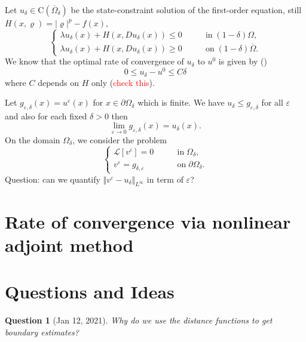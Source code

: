 \documentclass[11pt,reqno]{amsart}
\numberwithin{figure}{section}
\theoremstyle{plain}
\newtheorem{quest}{Question}
\theoremstyle{remark}
\numberwithin{equation}{section}
\newcommand{\rmC}{\mathrm{C}}
\begin{document}
\noindent Let $u_\delta\in \rmC(\overline{\Omega}_\delta)$ be the state-constraint solution of the first-order equation, still $H(x,\varrho) = |\varrho|^p - f(x)$,
\begin{equation*}
    \begin{cases}
    \lambda u_\delta(x) + H(x,Du_\delta(x)) \leq 0 &\qquad\text{in}\;(1-\delta)\Omega,\\
    \lambda u_\delta(x) + H(x,Du_\delta(x)) \geq 0 &\qquad\text{on}\;(1-\delta)\overline{\Omega}.
    \end{cases}
\end{equation*}
We know that the optimal rate of convergence of $u_\delta$ to $u^0$ is given by (\cite{kim_state-constraint_2020})
\begin{equation*}
    0\leq u_\delta - u^0 \leq C\delta
\end{equation*}
where $C$ depends on $H$ only (\textcolor{red}{check this}). 

\noindent Let $g_{\varepsilon,\delta}(x) = u^\varepsilon(x)$ for $x\in \partial\Omega_\delta$ which is finite. We have $u_\delta\leq g_{\varepsilon,\delta}$ for all $\varepsilon$ and also for each fixed $\delta>0$ then
\begin{equation*}
    \lim_{\varepsilon\to 0} g_{\varepsilon,\delta}(x) = u_\delta(x).
\end{equation*}
On the domain $\Omega_\delta$, we consider the problem
\begin{equation*}
    \begin{cases}
    \mathcal{L}[v^\varepsilon] = 0 &\qquad\text{in}\;\Omega_\delta,\\
    v^\varepsilon = g_{\delta,\varepsilon} &\qquad\text{on}\;\partial\Omega_\delta.
    \end{cases}
\end{equation*}
Question: can we quantify $\Vert v^\varepsilon - u_\delta\Vert_{L^\infty}$ in term of $\varepsilon$?

\section{Rate of convergence via nonlinear adjoint method}






\section{Questions and Ideas}
\begin{quest} [Jan 12, 2021] Why do we use the distance functions to get boundary estimates? 
\end{quest}
\end{document}
